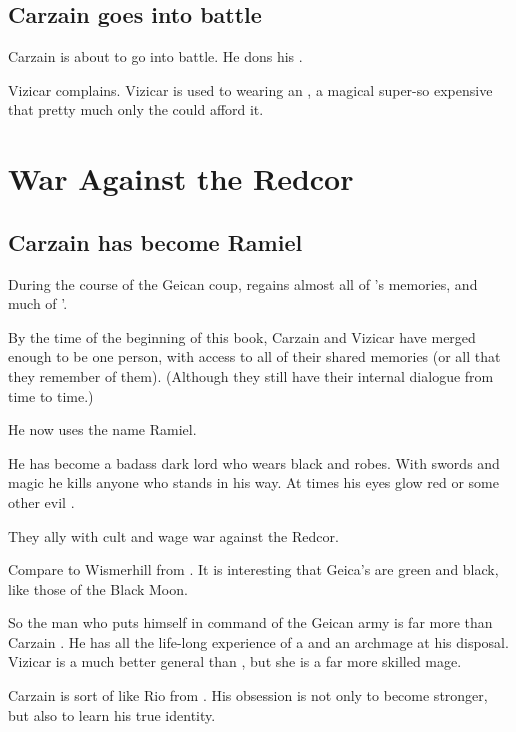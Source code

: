 \subsection{Carzain goes into battle}
Carzain is about to go into battle. He dons his \armour. 

Vizicar complains. 
Vizicar is used to wearing an , a magical super-\armour so expensive that pretty much only the \VaimonCaliphs could afford it. 















\section{War Against the Redcor}
\subsection{Carzain has become Ramiel}
During the course of the Geican coup,  regains almost all of 's memories, and much of '. 

By the time of the beginning of this book, Carzain and Vizicar have merged enough to be one person, with access to all of their shared memories (or all that they remember of them). (Although they still have their internal dialogue from time to time.)

He now uses the name Ramiel. 

He has become a badass dark lord who wears black \armour and robes. With swords and magic he kills anyone who stands in his way. At times his eyes glow red or some other evil \colour. 

They ally with  cult and wage war against the Redcor. 

Compare to Wismerhill from \FLuneNoire. It is interesting that Geica's \colours are green and black, like those of the Black Moon.

So the man who puts himself in command of the Geican army is far more than Carzain \Shireyo. He has all the life-long experience of a \VaimonCaliph and an archmage at his disposal. 
Vizicar is a much better general than \Belzir, but she is a far more skilled mage. 

Carzain is sort of like Rio from \emph{\JuukenSentaiGekiranger}. His obsession is not only to become stronger, but also to learn his true identity. 





